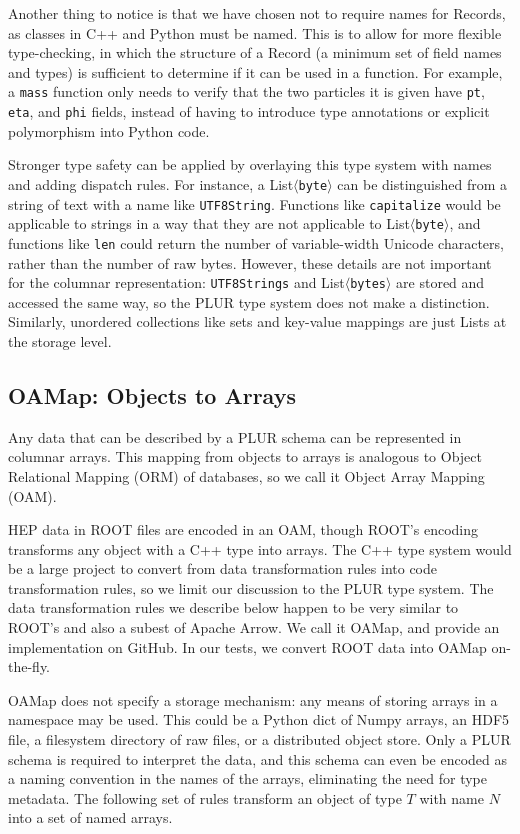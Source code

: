 \documentclass[10pt, conference, compsocconf]{IEEEtran}
\begin{document}
Another thing to notice is that we have chosen not to require names for Records, as classes in C++ and Python must be named. This is to allow for more flexible type-checking, in which the structure of a Record (a minimum set of field names and types) is sufficient to determine if it can be used in a function. For example, a {\tt mass} function only needs to verify that the two particles it is given have {\tt pt}, {\tt eta}, and {\tt phi} fields, instead of having to introduce type annotations or explicit polymorphism into Python code.

Stronger type safety can be applied by overlaying this type system with names and adding dispatch rules. For instance, a List$\langle${\tt byte}$\rangle$ can be distinguished from a string of text with a name like {\tt UTF8String}. Functions like {\tt capitalize} would be applicable to strings in a way that they are not applicable to List$\langle${\tt byte}$\rangle$, and functions like {\tt len} could return the number of variable-width Unicode characters, rather than the number of raw bytes. However, these details are not important for the columnar representation: {\tt UTF8Strings} and List$\langle${\tt bytes}$\rangle$ are stored and accessed the same way, so the PLUR type system does not make a distinction. Similarly, unordered collections like sets and key-value mappings are just Lists at the storage level.

\subsection{OAMap: Objects to Arrays}

Any data that can be described by a PLUR schema can be represented in columnar arrays. This mapping from objects to arrays is analogous to Object Relational Mapping (ORM) of databases, so we call it Object Array Mapping (OAM).

HEP data in ROOT files are encoded in an OAM, though ROOT's encoding transforms any object with a C++ type into arrays. The C++ type system would be a large project to convert from data transformation rules into code transformation rules, so we limit our discussion to the PLUR type system. The data transformation rules we describe below happen to be very similar to ROOT's and also a subest of Apache Arrow\cite{arrow-layout}. We call it OAMap, and provide an implementation\cite{oamap} on GitHub. In our tests, we convert ROOT data into OAMap on-the-fly.

OAMap does not specify a storage mechanism: any means of storing arrays in a namespace may be used. This could be a Python dict of Numpy arrays, an HDF5 file, a filesystem directory of raw files, or a distributed object store. Only a PLUR schema is required to interpret the data, and this schema can even be encoded as a naming convention in the names of the arrays, eliminating the need for type metadata. The following set of rules transform an object of type $T$ with name $N$ into a set of named arrays.
\end{document}
